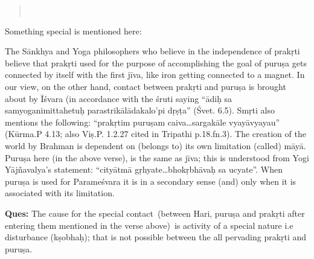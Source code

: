 \begin{verse}
\\
\end{verse}


Something special is mentioned here:

The Sānkhya and Yoga philosophers who believe in the independence of prakṛti believe that prakṛti used for the purpose of accomplishing the goal of puruṣa gets connected by itself with the first jīva, like iron getting connected to a magnet.  In our view, on the other hand, contact between prakṛti and puruṣa is brought about by Īśvara (in accordance with the śruti saying “ādiḥ sa samyoganimittahetuḥ parastrikālādakalo’pi dṛṣṭa” (Śvet. 6.5). Smṛti also mentions the following: “prakṛtim puruṣam caiva…sargakāle vyayāvyayau” (Kūrma.P 4.13; also Viṣ.P. 1.2.27 cited in Tripathi p.18.fn.3). The creation of the world by Brahman is dependent on (belongs to) its own limitation (called) māyā. Puruṣa here (in the above verse), is the same as jīva; this is understood from Yogi Yājñavalya’s statement: “cityātmā gṛhyate…bhokṛbhāvaḥ sa ucyate”. When puruṣa is used for Parameśvara it is in a secondary sense (and) only when it is associated with its limitation.

\textbf{Ques:} The cause for the special contact (between Hari, puruṣa and prakṛti after entering them mentioned in the verse above) is activity of a special nature i.e disturbance (kṣobhaḥ); that is not possible between the all pervading prakṛti and puruṣa.

